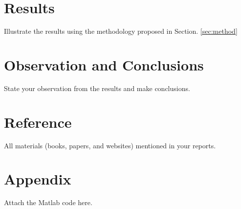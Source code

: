 \documentclass{ifacconf}
\begin{document}
\section{Results}
Illustrate the results using the methodology proposed in Section. \ref{sec:method}

\section{Observation and Conclusions}
State your observation from the results and make conclusions. 

\section*{Reference}
All materials (books, papers, and websites) mentioned in your reports.   
\section*{Appendix}
Attach the Matlab code here.
\end{document}
